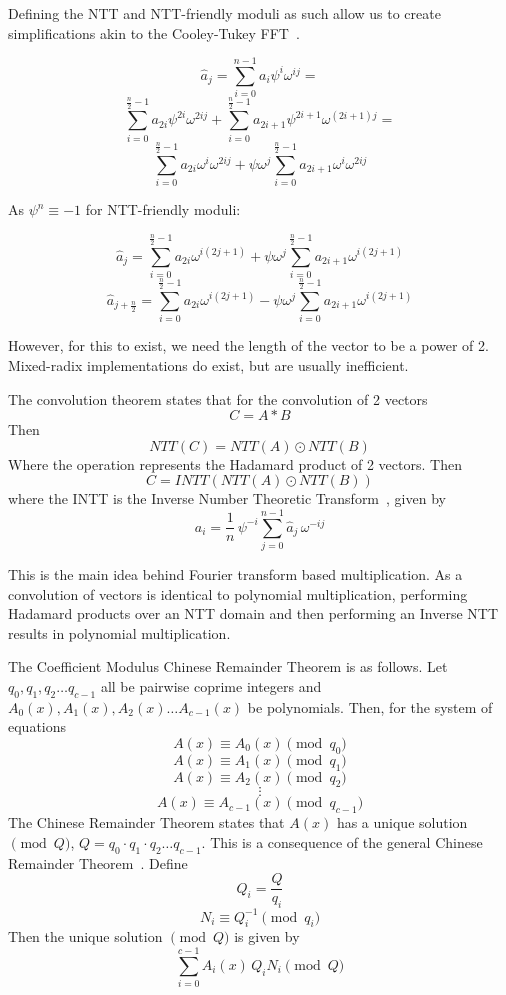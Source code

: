 \documentclass[runningheads]{llncs}
\begin{document}
Defining the NTT and NTT-friendly moduli as such allow us to create simplifications akin to the Cooley-Tukey FFT~\cite{cooley1965algorithm}.

$$\hat{a}_j=\sum_{i=0}^{n-1}a_{i}\psi^{i}\omega^{ij}=$$
$$\sum_{i=0}^{\frac{n}{2}-1}a_{2i}\psi^{2i}\omega^{2ij}+\sum_{i=0}^{\frac{n}{2}-1}a_{2i+1}\psi^{2i+1}\omega^{(2i+1)j}=$$
$$\sum_{i=0}^{\frac{n}{2}-1}a_{2i}\omega^{i}\omega^{2ij}+\psi\omega^{j}\sum_{i=0}^{\frac{n}{2}-1}a_{2i+1}\omega^{i}\omega^{2ij}$$

As $\psi^{n}\equiv-1$ for NTT-friendly moduli:

$$\hat{a}_j=\sum_{i=0}^{\frac{n}{2}-1}a_{2i}\omega^{i(2j+1)}+\psi\omega^{j}\sum_{i=0}^{\frac{n}{2}-1}a_{2i+1}\omega^{i(2j+1)}$$
$$\hat{a}_{j+\frac{n}{2}}=\sum_{i=0}^{\frac{n}{2}-1}a_{2i}\omega^{i(2j+1)}-\psi\omega^{j}\sum_{i=0}^{\frac{n}{2}-1}a_{2i+1}\omega^{i(2j+1)}$$

However, for this to exist, we need the length of the vector to be a power of 2. Mixed-radix implementations do exist, but are usually inefficient.

\begin{definition}
The convolution theorem states that for the convolution of 2 vectors
$$C=A*B$$
Then
$$NTT(C)=NTT(A)\odot NTT(B)$$
Where the operation represents the Hadamard product of 2 vectors. Then
$$C=INTT(NTT(A)\odot NTT(B))$$
where the INTT is the Inverse Number Theoretic Transform~\cite{gentleman1966fft}, given by
$$a_i=\frac{1}{n}\,\psi^{-i}\sum_{j=0}^{n-1}\hat{a}_{j}\,\omega^{-ij}$$
\end{definition}

This is the main idea behind Fourier transform based multiplication. As a convolution of vectors is identical to polynomial multiplication, performing Hadamard products over an NTT domain and then performing an Inverse NTT results in polynomial multiplication.

\begin{definition}
    The Coefficient Modulus Chinese Remainder Theorem is as follows. Let $q_0, q_1, q_2 \dots q_{c-1}$ all be pairwise coprime integers and $A_0(x), A_1(x), A_2(x) \dots A_{c-1}(x)$ be polynomials. Then, for the system of equations
    $$A(x) \equiv A_0(x) \pmod{q_0}$$
    $$A(x) \equiv A_1(x) \pmod{q_1}$$
    $$A(x) \equiv A_2(x) \pmod{q_2}$$
    $$\vdots$$
    $$A(x) \equiv A_{c-1}(x) \pmod{q_{c-1}}$$
    The Chinese Remainder Theorem states that $A(x)$ has a unique solution $\pmod{Q}$, $Q = q_0 \cdotp q_1 \cdotp q_2 \dots q_{c-1}$. This is a consequence of the general Chinese Remainder Theorem~\cite{dummit2004abstract}. Define
    $$Q_i = \frac{Q}{q_i}$$
    $$N_i \equiv Q_i^{-1} \pmod{q_i}$$
    Then the unique solution $\pmod{Q}$ is given by
    $$\sum_{i=0}^{c-1} A_i(x)\, Q_i N_i \pmod{Q}$$
\end{definition}
\end{document}
